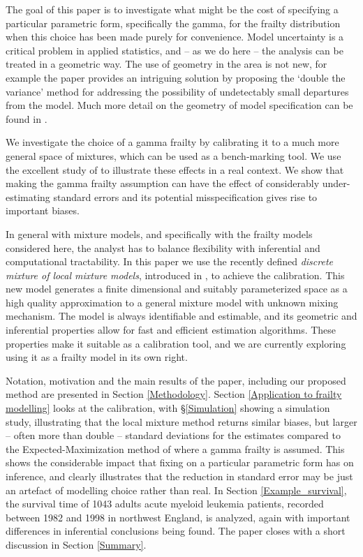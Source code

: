 \documentclass[graybox]{svmult}
\begin{document}
 The goal of this paper is to investigate what might be the  cost  of
specifying a particular parametric form, specifically the gamma, for the frailty distribution when  this choice has been made purely for convenience.  Model uncertainty is a critical problem in applied statistics, and -- as we do here --  the analysis can be treated in a geometric way. The use of geometry in the area is not new, for example the  paper \cite{copas2005local} provides an intriguing solution by proposing  the `double the variance' method for addressing the possibility of undetectably small departures from the model.  Much more detail on the geometry of model specification  can be found in \cite{Anaya2016CIG}.


We investigate the choice of a gamma frailty by calibrating it to a much more general space of mixtures, which can be used as a bench-marking  tool. We use the excellent study of
\cite{Henderson2002} to illustrate these effects in a real context. We  show that 
making  the gamma frailty assumption can have the effect of considerably under-estimating standard errors and its potential
misspecification gives rise to  important biases.  



In general with mixture models, and specifically with the frailty models considered here, the analyst has to balance flexibility with   inferential and computational tractability. In this paper we  use the recently defined {\em discrete mixture of local mixture models}, introduced in \cite{Maroufy2016a}, to achieve the  calibration.  This new model
 generates  a finite dimensional and suitably  parameterized space as a high quality approximation  to a general mixture model with unknown mixing
mechanism. The model is  always identifiable and estimable, and its geometric and inferential properties allow for
fast and efficient estimation algorithms.  These properties make it suitable as a calibration tool, and we are currently exploring using it as a frailty model in its own right.





Notation, motivation and the main results of the paper, including our proposed method
are presented in Section \ref{Methodology}.  Section \ref{Application to frailty modelling} looks at the calibration, with  \S  \ref{Simulation} showing a
simulation study, illustrating that the local mixture method returns similar biases, but larger --
often more than double -- standard deviations for the estimates compared to the Expected-Maximization method
of \cite{Klein1992} where a gamma frailty is assumed. This shows the  considerable impact that fixing on a particular parametric form has on inference, and clearly illustrates that the reduction in standard error may be just an artefact of modelling choice rather than real.
 In Section \ref{Example_survival}, the survival time of 1043
adults acute myeloid leukemia patients, recorded between 1982 and 1998 in northwest England, is analyzed, again with important differences in  inferential conclusions being found.
The paper  closes with a short discussion in Section \ref{Summary}.
\end{document}
